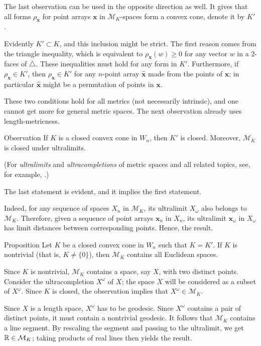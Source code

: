 \documentclass[a4paper,10pt]{article}
\begin{document}
The last observation can be used in the opposite direction as well.
It gives that all forms $\rho_{\bm{x}}$ for point arrays $\bm{x}$ in $\mathcal{M}_K$-spaces form a convex cone, denote it by $K'$.

Evidently $K'\subset K$, and this inclusion might be strict.
The first reason comes from the triangle inequality, which is equivalent to $\rho_{\bm{x}}(w)\ge 0$ for any vector $w$ in a 2-faces of $\triangle$.
These inequalities must hold for any form in $K'$.
Furthermore, if $\rho_{\bm{x}}\in K'$, then $\rho_{\hat{\bm{x}}}\in K'$ for any $n$-point array $\hat{\bm{x}}$ made from the points of $\bm{x}$; in particular $\hat{\bm{x}}$ might be a permutation of points in $\bm{x}$.

These two conditions hold for all metrics (not necessarily intrinsic),
and one cannot get more for general metric spaces.
The next observation already uses length-metricness.

\begin{thm}{Observation}
If $K$ is a closed convex cone in $W_n$, then $K'$ is closed.
Moreover, $\mathcal{M}_K$ is closed under ultralimits.
\end{thm}

(For \emph{ultralimits} and \emph{ultracompletions} of metric spaces and all related topics, see, for example, \cite{petrunin2023}.)

The last statement is evident, and it implies the first statement.

Indeed, for any sequence of spaces $X_n$ in $\mathcal{M}_K$, its ultralimit $X_\omega$ also belongs to $\mathcal{M}_K$.
Therefore, given a sequence of point arrays $\bm{x}_n$ in $X_n$,
its ultralimit $\bm{x}_\omega$ in $X_\omega$ has limit distances between corresponding points.
Hence, the result.
\qeds

\begin{thm}{Proposition}\label{prop:Associated form}
Let $K$ be a closed convex cone in $W_n$ such that $K=K'$.
If $K$ is nontrivial (that is, $K\ne \{0\}$), then $\mathcal{M}_K$ contains all Euclidean spaces.
\end{thm}

Since $K$ is nontrivial, $\mathcal{M}_K$ contains a space, say $X$, with two distinct points.
Consider the ultracompletion $X^\omega$ of $X$;
the space $X$ will be considered as a subset of $X^\omega$.
Since $K$ is closed, the observation implies that $X^\omega\in \mathcal{M}_K$.

Since  $X$ is a length space, $X^\omega$ has to be geodesic.
Since $X^\omega$
contains a pair of distinct points, it must contain a nontrivial geodesic.
It follows that $\mathcal{M}_K$ contains a line segment.
By rescaling the segment and passing to the ultralimit, we get $\mathbb{R}\in \mathcal{M}_K$;
taking products of real lines then yields the result.
\qeds
\end{document}
